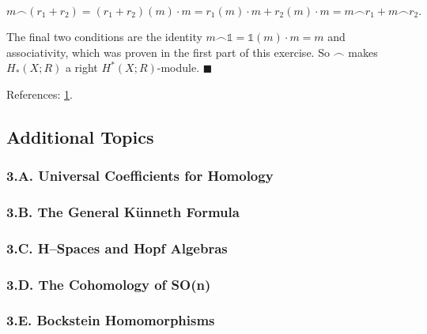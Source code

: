 \documentclass{article}
\begin{document}
$$m\frown (r_{1} + r_{2}) = (r_{1} + r_{2})(m)\cdot m = r_{1}(m)\cdot m + r_{2}(m)\cdot m = m\frown r_{1} + m\frown r_{2}.$$

The final two conditions are the identity $m\frown \mathds{1} = \mathds{1}(m)\cdot m = m$ and associativity, which was proven in the first part of this exercise. So $\frown$ makes $H_{\ast}(X; R)$ a right $H^{\ast}(X; R)$-module. $\blacksquare$
\medskip

References: \href{https://math.stackexchange.com/questions/144518/what-exactly-is-an-r-module}{1}.
\bigskip
\bigskip

\subsection*{Additional Topics}

\subsubsection*{3.A. Universal Coefficients for Homology}

\subsubsection*{3.B. The General Künneth Formula}

\subsubsection*{3.C. H–Spaces and Hopf Algebras}

\subsubsection*{3.D. The Cohomology of SO(n)}

\subsubsection*{3.E. Bockstein Homomorphisms}
\end{document}
